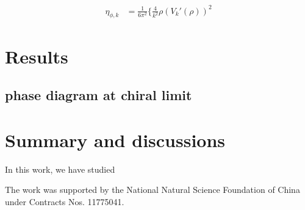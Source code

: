 \documentclass[%
reprint,
superscriptaddress,
showpacs,preprintnumbers,
 amsmath,amssymb,
 aps,
prd,
]{revtex4-1}
\begin{document}
\begin{align}
	\eta_{\phi,k}&=\frac{1}{6\pi^2} \Big\{ \frac{4}{k^2} \rho (V_k'(\rho))^2
\end{align}
\section{Results}
\label{sec:Results}

\subsection{phase diagram at chiral limit}


\section{Summary and discussions}
\label{sec:sum}

In this work, we have studied


\begin{acknowledgments}

The work was supported by the National Natural Science Foundation of China under Contracts Nos. 11775041.

\end{acknowledgments}




\end{document}
